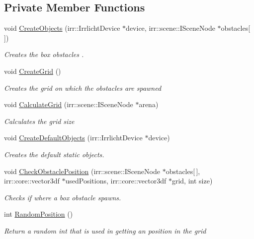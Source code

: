 \subsection*{Private Member Functions}
\begin{DoxyCompactItemize}
\item 
void \hyperlink{class_object_placement_generation_a45cc4cdf5790a5a840aa42ee61691275}{Create\-Objects} (irr\-::\-Irrlicht\-Device $\ast$device, irr\-::scene\-::\-I\-Scene\-Node $\ast$obstacles\mbox{[}$\,$\mbox{]})
\begin{DoxyCompactList}\small\item\em Creates the box obstacles . \end{DoxyCompactList}\item 
void \hyperlink{class_object_placement_generation_af7a0d12091e5cd027ec0ed5c932f217b}{Create\-Grid} ()
\begin{DoxyCompactList}\small\item\em Creates the grid on which the obstacles are spawned \end{DoxyCompactList}\item 
void \hyperlink{class_object_placement_generation_a2f996c36e413be2633c8795fcb4fd168}{Calculate\-Grid} (irr\-::scene\-::\-I\-Scene\-Node $\ast$arena)
\begin{DoxyCompactList}\small\item\em Calculates the grid size \end{DoxyCompactList}\item 
void \hyperlink{class_object_placement_generation_ab8cb3f9b393d7f59365410749a275317}{Create\-Default\-Objects} (irr\-::\-Irrlicht\-Device $\ast$device)
\begin{DoxyCompactList}\small\item\em Creates the default static objects. \end{DoxyCompactList}\item 
void \hyperlink{class_object_placement_generation_ae5ad2c3a1d486640f7bb4f53ca51e194}{Check\-Obstacle\-Position} (irr\-::scene\-::\-I\-Scene\-Node $\ast$obstacles\mbox{[}$\,$\mbox{]}, irr\-::core\-::vector3df $\ast$used\-Positions, irr\-::core\-::vector3df $\ast$grid, int size)
\begin{DoxyCompactList}\small\item\em Checks if where a box obstacle spawns. \end{DoxyCompactList}\item 
int \hyperlink{class_object_placement_generation_a3fcec4d57ec62f0a38d9a741f30ffc0f}{Random\-Position} ()
\begin{DoxyCompactList}\small\item\em Return a random int that is used in getting an position in the grid\end{DoxyCompactList}\end{DoxyCompactItemize}
